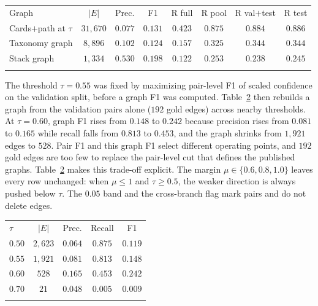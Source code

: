 \documentclass{ws-ijait}
\begin{document}
\begin{table}[th]
{\begin{tabular}{@{}lccccccc@{}}
\toprule
Graph & $\lvert E\rvert$ & Prec. & {F1} & R full & R pool & R val$+$test & R test \\
\colrule
Cards$+$path at $\tau$ & $31{,}670$ & $0.077$ & $0.131$ & $0.423$ & $0.875$ & $0.884$ & $0.886$ \\
Taxonomy graph & $8{,}896$ & $0.102$ & $0.124$ & $0.157$ & $0.325$ & $0.344$ & $0.344$ \\
Stack graph & $1{,}334$ & $0.530$ & $0.198$ & $0.122$ & $0.253$ & $0.238$ & $0.245$ \\
\botrule
\end{tabular}}
\label{tab:graph}
\end{table}

The threshold $\tau=0.55$ was fixed by maximizing pair-level {F1} of
scaled confidence on the validation split, before a graph {F1} was
computed.
Table~\ref{tab:sens} then rebuilds a graph from the validation pairs
alone ($192$ gold edges) across nearby thresholds.
At $\tau=0.60$, graph {F1} rises from $0.148$ to $0.242$ because
precision rises from $0.081$ to $0.165$ while recall falls from
$0.813$ to $0.453$, and the graph shrinks from $1{,}921$ edges to
$528$.
Pair {F1} and this graph {F1} select different operating points, and
$192$ gold edges are too few to replace the pair-level cut that
defines the published graphs.
Table~\ref{tab:sens} makes this trade-off explicit.
The margin $\mu\in\{0.6,0.8,1.0\}$ leaves every row unchanged: when
$\mu\le 1$ and $\tau\ge 0.5$, the weaker direction is always pushed
below $\tau$.
The $0.05$ band and the cross-branch flag mark pairs and do not
delete edges.

\begin{table}[th]
{\begin{tabular}{@{}lcccc@{}}
\toprule
$\tau$ & $\lvert E\rvert$ & Prec. & Recall & {F1} \\
\colrule
$0.50$ & $2{,}623$ & $0.064$ & $0.875$ & $0.119$ \\
$0.55$ & $1{,}921$ & $0.081$ & $0.813$ & $0.148$ \\
$0.60$ & $528$ & $0.165$ & $0.453$ & $0.242$ \\
$0.70$ & $21$ & $0.048$ & $0.005$ & $0.009$ \\
\botrule
\end{tabular}}
\label{tab:sens}
\end{table}
\end{document}
